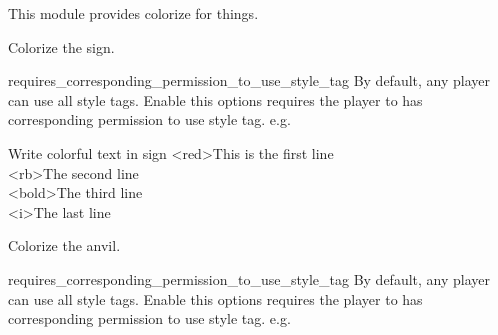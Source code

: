
This module provides colorize for things.

Colorize the sign.

\begin{Configuration}
    \item[requires\_corresponding\_permission\_to\_use\_style\_tag]{By default, any player can use all style tags. Enable this options requires the player to has corresponding permission to use style tag. e.g. }
\end{Configuration}

\begin{example}{Write colorful text in sign}
    <red>This is the first line\\
    <rb>The second line\\
    <bold>The third line\\
    <i>The last line
\end{example}

\clearpage
{}
Colorize the anvil.

\begin{Configuration}
    \item[requires\_corresponding\_permission\_to\_use\_style\_tag]{By default, any player can use all style tags. Enable this options requires the player to has corresponding permission to use style tag. e.g. }
\end{Configuration}

